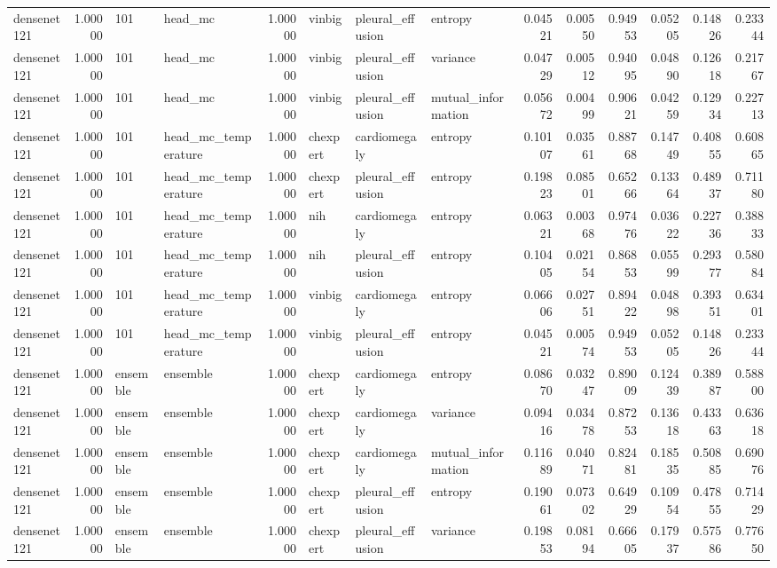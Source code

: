 \begin{tabular}{lrllrlllrrrrrr}
densenet121 & 1.00000 & 101 & head\_mc & 1.00000 & vinbig & pleural\_effusion & entropy & 0.04521 & 0.00550 & 0.94953 & 0.05205 & 0.14826 & 0.23344 \\
densenet121 & 1.00000 & 101 & head\_mc & 1.00000 & vinbig & pleural\_effusion & variance & 0.04729 & 0.00512 & 0.94095 & 0.04890 & 0.12618 & 0.21767 \\
densenet121 & 1.00000 & 101 & head\_mc & 1.00000 & vinbig & pleural\_effusion & mutual\_information & 0.05672 & 0.00499 & 0.90621 & 0.04259 & 0.12934 & 0.22713 \\
densenet121 & 1.00000 & 101 & head\_mc\_temperature & 1.00000 & chexpert & cardiomegaly & entropy & 0.10107 & 0.03561 & 0.88768 & 0.14749 & 0.40855 & 0.60865 \\
densenet121 & 1.00000 & 101 & head\_mc\_temperature & 1.00000 & chexpert & pleural\_effusion & entropy & 0.19823 & 0.08501 & 0.65266 & 0.13364 & 0.48937 & 0.71180 \\
densenet121 & 1.00000 & 101 & head\_mc\_temperature & 1.00000 & nih & cardiomegaly & entropy & 0.06321 & 0.00368 & 0.97476 & 0.03622 & 0.22736 & 0.38833 \\
densenet121 & 1.00000 & 101 & head\_mc\_temperature & 1.00000 & nih & pleural\_effusion & entropy & 0.10405 & 0.02154 & 0.86853 & 0.05599 & 0.29377 & 0.58084 \\
densenet121 & 1.00000 & 101 & head\_mc\_temperature & 1.00000 & vinbig & cardiomegaly & entropy & 0.06606 & 0.02751 & 0.89422 & 0.04898 & 0.39351 & 0.63401 \\
densenet121 & 1.00000 & 101 & head\_mc\_temperature & 1.00000 & vinbig & pleural\_effusion & entropy & 0.04521 & 0.00574 & 0.94953 & 0.05205 & 0.14826 & 0.23344 \\
densenet121 & 1.00000 & ensemble & ensemble & 1.00000 & chexpert & cardiomegaly & entropy & 0.08670 & 0.03247 & 0.89009 & 0.12439 & 0.38987 & 0.58800 \\
densenet121 & 1.00000 & ensemble & ensemble & 1.00000 & chexpert & cardiomegaly & variance & 0.09416 & 0.03478 & 0.87253 & 0.13618 & 0.43363 & 0.63618 \\
densenet121 & 1.00000 & ensemble & ensemble & 1.00000 & chexpert & cardiomegaly & mutual\_information & 0.11689 & 0.04071 & 0.82481 & 0.18535 & 0.50885 & 0.69076 \\
densenet121 & 1.00000 & ensemble & ensemble & 1.00000 & chexpert & pleural\_effusion & entropy & 0.19061 & 0.07302 & 0.64929 & 0.10954 & 0.47855 & 0.71429 \\
densenet121 & 1.00000 & ensemble & ensemble & 1.00000 & chexpert & pleural\_effusion & variance & 0.19853 & 0.08194 & 0.66605 & 0.17937 & 0.57586 & 0.77650 \\

\end{tabular}
